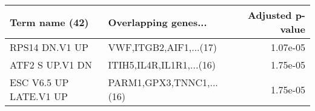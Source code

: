 \begin{tabular}{llr}
\toprule
        Term name (42) &     Overlapping genes... &  Adjusted p-value \\
\midrule
        RPS14 DN.V1 UP &   VWF,ITGB2,AIF1,...(17) &          1.07e-05 \\
       ATF2 S UP.V1 DN & ITIH5,IL4R,IL1R1,...(16) &          1.75e-05 \\
ESC V6.5 UP LATE.V1 UP & PARM1,GPX3,TNNC1,...(16) &          1.75e-05 \\
\bottomrule
\end{tabular}
